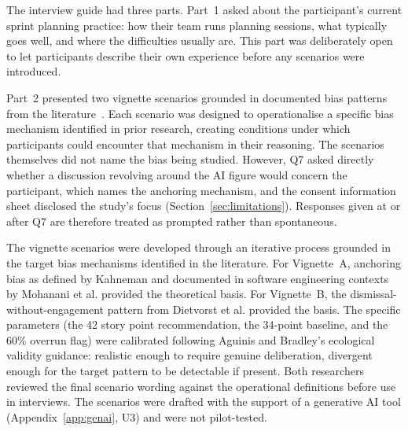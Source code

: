 \documentclass[a4paper,twoside]{bth}
\begin{document}
The interview guide had three parts. Part~1 asked about the participant's current sprint planning practice: how their team runs planning sessions, what typically goes well, and where the difficulties usually are. This part was deliberately open to let participants describe their own experience before any scenarios were introduced.

Part~2 presented two vignette scenarios grounded in documented bias patterns from the literature~\cite{mohanani2018cognitive, dietvorst2015algorithm, aguinis2014best}. Each scenario was designed to operationalise a specific bias mechanism identified in prior research, creating conditions under which participants could encounter that mechanism in their reasoning. The scenarios themselves did not name the bias being studied. However, Q7 asked directly whether a discussion revolving around the AI figure would concern the participant, which names the anchoring mechanism, and the consent information sheet disclosed the study's focus (Section~\ref{sec:limitations}). Responses given at or after Q7 are therefore treated as prompted rather than spontaneous.

The vignette scenarios were developed through an iterative process grounded in the target bias mechanisms identified in the literature. For Vignette~A, anchoring bias as defined by Kahneman and documented in software engineering contexts by Mohanani et al. provided the theoretical basis. For Vignette~B, the dismissal-without-engagement pattern from Dietvorst et al. provided the basis. The specific parameters (the 42 story point recommendation, the 34-point baseline, and the 60\% overrun flag) were calibrated following Aguinis and Bradley's ecological validity guidance: realistic enough to require genuine deliberation, divergent enough for the target pattern to be detectable if present. Both researchers reviewed the final scenario wording against the operational definitions before use in interviews. The scenarios were drafted with the support of a generative AI tool (Appendix~\ref{app:genai}, U3) and were not pilot-tested.
\end{document}
